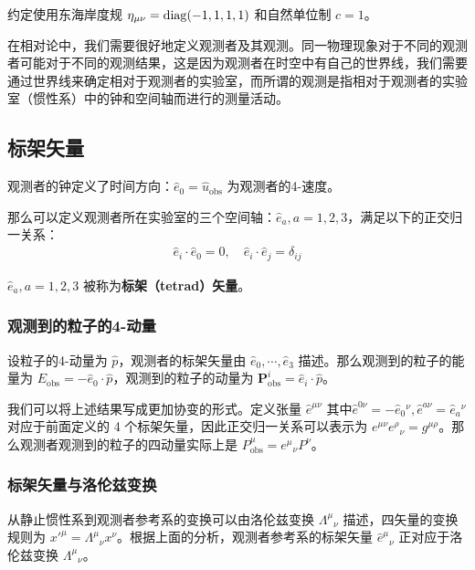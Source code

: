 

约定使用东海岸度规 $\eta_{\mu\nu}=\rm{diag}(-1,1,1,1)$ 和自然单位制 $c=1$。

在相对论中，我们需要很好地定义观测者及其观测。同一物理现象对于不同的观测者可能对于不同的观测结果，这是因为观测者在时空中有自己的世界线，我们需要通过世界线来确定相对于观测者的实验室，而所谓的观测是指相对于观测者的实验室（惯性系）中的钟和空间轴而进行的测量活动。\cite{陈斌广相}

\subsection{标架矢量}

观测者的钟定义了时间方向：$\hat{e}_0=\hat{u}_\text{obs}$ 为观测者的4-速度。

那么可以定义观测者所在实验室的三个空间轴：$\hat{e}_a,a=1,2,3$，满足以下的正交归一关系：
\begin{equation}
\begin{aligned}
\hat{e}_i\cdot \hat{e}_0=0,\quad \hat{e}_i\cdot \hat{e}_j=\delta_{ij}
\end{aligned}
\end{equation}

$\hat{e}_a,a=1,2,3$ 被称为\textbf{标架（tetrad）矢量}。
\subsubsection{观测到的粒子的4-动量}
设粒子的4-动量为 $\hat p$，观测者的标架矢量由 $\hat{e}_0,\cdots,\hat{e}_3$ 描述。那么观测到的粒子的能量为 $E_\text{obs}=-\hat{e}_0\cdot\hat{p}$，观测到的粒子的动量为 $\boldsymbol P_\text{obs}^i=\hat{e}_i\cdot\hat{p}$。

我们可以将上述结果写成更加协变的形式。定义张量 $\hat{e}^{\mu\nu}$ 其中$\hat{e}^{0\nu}=-\hat{e}_0{}^\nu,\hat{e}^{a\nu}=\hat{e}_a{}^\nu$ 对应于前面定义的 4 个标架矢量，因此正交归一关系可以表示为 $e^{\mu\nu} e^\rho{}_\nu=g^{\mu\rho}$。那么观测者观测到的粒子的四动量实际上是 $P^\mu_\text{obs}=e^\mu{}_\nu P^\nu$。
\subsubsection{标架矢量与洛伦兹变换}
从静止惯性系到观测者参考系的变换可以由洛伦兹变换 $\Lambda^\mu{}_\nu$ 描述，四矢量的变换规则为 ${x'}^{\mu}=\Lambda^\mu{}_\nu x^\nu$。根据上面的分析，观测者参考系的标架矢量 $\hat{e}^\mu{}_\nu$ 正对应于洛伦兹变换 $\Lambda^\mu{}_\nu$。

